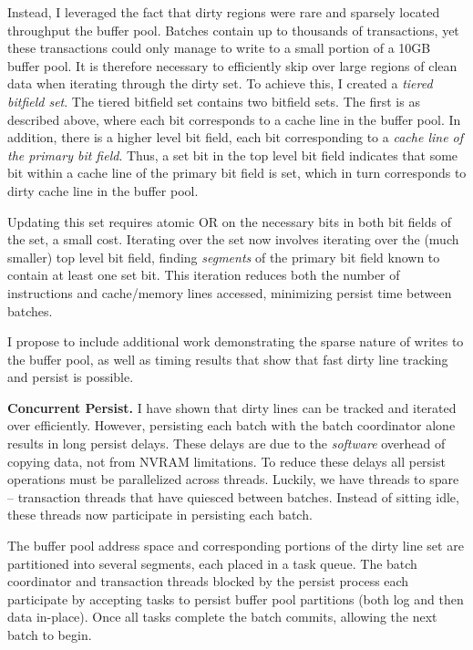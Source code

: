 Instead, I leveraged the fact that dirty regions were rare and sparsely located throughput the buffer pool.
Batches contain up to thousands of transactions, yet these transactions could only manage to write to a small portion of a 10GB buffer pool.
It is therefore necessary to efficiently skip over large regions of clean data when iterating through the dirty set.
To achieve this, I created a \emph{tiered bitfield set}.
The tiered bitfield set contains two bitfield sets.
The first is as described above, where each bit corresponds to a cache line in the buffer pool.
In addition, there is a higher level bit field, each bit corresponding to a \emph{cache line of the primary bit field}.
Thus, a set bit in the top level bit field indicates that some bit within a cache line of the primary bit field is set, which in turn corresponds to dirty cache line in the buffer pool.

Updating this set requires atomic OR on the necessary bits in both bit fields of the set, a small cost.
Iterating over the set now involves iterating over the (much smaller) top level bit field, finding \emph{segments} of the primary bit field known to contain at least one set bit.
This iteration reduces both the number of instructions and cache/memory lines accessed, minimizing persist time between batches.

I propose to include additional work demonstrating the sparse nature of writes to the buffer pool, as well as timing results that show that fast dirty line tracking and persist is possible.

\textbf{Concurrent Persist.}
I have shown that dirty lines can be tracked and iterated over efficiently.
However, persisting each batch with the batch coordinator alone results in long persist delays.
These delays are due to the \emph{software} overhead of copying data, not from NVRAM limitations.
To reduce these delays all persist operations must be parallelized across threads.
Luckily, we have threads to spare -- transaction threads that have quiesced between batches.
Instead of sitting idle, these threads now participate in persisting each batch.

The buffer pool address space and corresponding portions of the dirty line set are partitioned into several segments, each placed in a task queue.
The batch coordinator and transaction threads blocked by the persist process each participate by accepting tasks to persist buffer pool partitions (both log and then data in-place).
Once all tasks complete the batch commits, allowing the next batch to begin.

